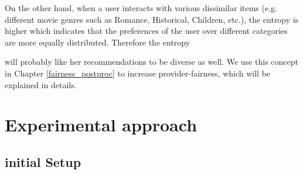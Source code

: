         On the other hand, when a user interacts with various dissimilar items (e.g. different movie genres such as Romance, Historical, Children, etc.), the entropy is higher which indicates that the preferences of the user over different categories are more equally distributed. Therefore the entropy
        
        will probably like her recommendations to be diverse as well. We use this concept in Chapter \ref{fairness_postproc} to increase provider-fairness, which will be explained in details.
        
        
        
    
    

        
        
            


\section{Experimental approach}
    
    \subsection{initial Setup}
    

